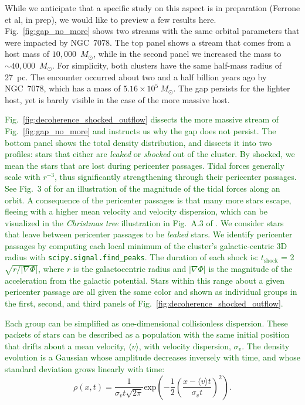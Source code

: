 \documentclass{aa}
\newcommand{\salvatore}[1]{\textcolor{darkgreen}{{#1}}}
\begin{document}
\begin{appendix}
While we anticipate that a specific study on this aspect is in preparation (Ferrone et al, in prep), we would like to preview a few results here.
Fig.~\ref{fig:gap_no_more} shows two streams with the same orbital parameters that were impacted by NGC~7078. The top panel shows a stream that comes from a host mass of $10,000$~$M_\odot$, while in the second panel we increased the mass to $\sim40,000$~$M_\odot$. For simplicity, both clusters have the same half-mass radius of 27~pc. The encounter occurred about two and a half billion years ago by NGC~7078, which has a mass of $5.16\times10^{5}~M_\odot$. The gap persists for the lighter host, yet is barely visible in the case of the more massive host. 

\salvatore{Fig.~\ref{fig:decoherence_shocked_outflow} dissects the more massive stream of Fig.~\ref{fig:gap_no_more} and instructs us why the gap does not persist. The bottom panel shows the total density distribution, and dissects it into two profiles: stars that either are \textit{leaked} or \textit{shocked} out of the cluster. By shocked, we mean the stars that are lost during pericenter passages. Tidal forces generally scale with $r^{-3}$, thus significantly strengthening through their pericenter passages. See Fig.~3 of \citet{2004AJ....127.2753D} for an illustration of the magnitude of the tidal forces along an orbit. A consequence of the pericenter passages is that many more stars escape, fleeing with a higher mean velocity and velocity dispersion, which can be visualized in the \textit{Christmas tree} illustration in Fig.~A.3 of \citet{2012A&A...546L...7M}. We consider stars that leave between pericenter passages to be \textit{leaked} stars. We identify pericenter passages by computing each local minimum of the cluster's galactic-centric 3D radius with \texttt{scipy.signal.find\_peaks}. The duration of each shock is: $t_{\textrm{shock}}$ = 2$\sqrt{r/|\nabla\Phi|}$, where $r$ is the galactocentric radius and $|\nabla\Phi|$ is the magnitude of the acceleration from the galactic potential. Stars within this range about a given pericenter passage are all given the same color and shown as individual groups in the first, second, and third panels of Fig.~\ref{fig:decoherence_shocked_outflow}.}


\salvatore{Each group can be simplified as one-dimensional collisionless dispersion. These packets of stars can be described as a population with the same initial position that drifts about a mean velocity, $\langle v \rangle$, with velocity dispersion, $\sigma_v$. The density evolution is a Gaussian whose amplitude decreases inversely with time, and whose standard deviation grows linearly with time:}
\begin{equation}    
        \rho(x,t) = \frac{1}{\sigma_v t \sqrt{2\pi} }\textrm{exp}\left(-\frac{1}{2}\left(\frac{x-\langle v \rangle t}{\sigma_v t}\right)^2\right).
\end{equation}


\end{appendix}
\end{document}
